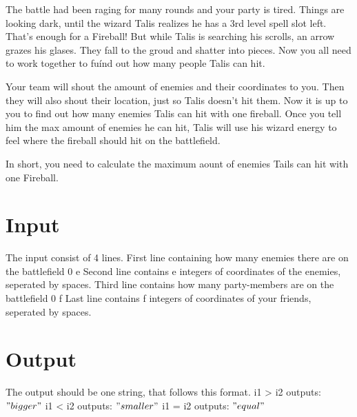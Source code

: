 
The battle had been raging for many rounds and your party is tired. Things are looking dark, until the wizard Talis realizes he has a 3rd level spell slot left. That's enough for a Fireball! But while Talis is searching his scrolls, an arrow grazes his glases. They fall to the groud and shatter into pieces. Now you all need to work together to fuínd out how many people Talis can hit. 

Your team will shout the amount of enemies and their coordinates to you. Then they will also shout their location, just so Talis doesn't hit them. Now it is up to you to find out how many enemies Talis can hit with one fireball. Once you tell him the max amount of enemies he can hit, Talis will use his wizard energy to feel where the fireball should hit on the battlefield. 

In short, you need to calculate the maximum aount of enemies Tails can hit with one Fireball.

\section*{Input}

The input consist of 4 lines. 
First line containing how many enemies there are on the battlefield 0 \leq e 
Second line contains e integers of coordinates of the enemies, seperated by spaces.
Third line contains how many party-members are on the battlefield 0 \leq f 
Last line contains f integers of coordinates of your friends, seperated by spaces.

\section*{Output}

The output should be one string, that follows this format.
i1 > i2 outputs: $"bigger"$
i1 < i2 outputs: $"smaller"$ 
i1 = i2 outputs: $"equal"$
